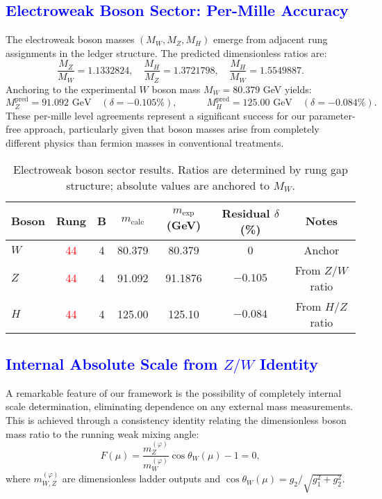 \documentclass[%
amsmath,amssymb,
aps,
prb,
floatfix, showkeys, 10pt,
]{revtex4-2}
\newcommand{\need}[1]{\textcolor{red}{#1}}
\newcommand{\modif}[1]{\textcolor{blue}{#1}}
\begin{document}
{\modif{ \subsection{Electroweak Boson Sector: Per-Mille Accuracy}
\label{subsec:boson_results}  }}
The electroweak boson masses $(M_W, M_Z, M_H)$ emerge from adjacent rung assignments in the ledger structure. The predicted dimensionless ratios are:
\begin{equation}
\frac{M_Z}{M_W} = 1.1332824, \quad
\frac{M_H}{M_Z} = 1.3721798, \quad
\frac{M_H}{M_W} = 1.5549887.
\end{equation}
Anchoring to the experimental $W$ boson mass $M_W = 80.379$ GeV yields:
\begin{equation}
M_Z^{\text{pred}} = 91.092 \text{ GeV} \quad (\delta = -0.105\%), \quad \quad \quad
M_H^{\text{pred}} = 125.00 \text{ GeV} \quad (\delta = -0.084\%).
\end{equation}
These per-mille level agreements represent a significant success for our parameter-free approach, particularly given that boson masses arise from completely different physics than fermion masses in conventional treatments.
\begin{table}[ht]
\centering
\caption{Electroweak boson sector results. Ratios are determined by rung gap structure; absolute values are anchored to $M_W$.}
\label{tab:bosons}
\begin{tabular}{lcccccc}
\hline\hline
Boson & Rung & B & $m_{\text{calc}}$ & $m_{\text{exp}}$ (GeV) & Residual $\delta$(\%) &  Notes \\
\hline
$W$ &  {\need{44}}    & 4 &  80.379 & 80.379     & 0        & Anchor           \\
$Z$ &  {\need{44}}    & 4 &  91.092 & 91.1876    & $-0.105$ & From $Z/W$ ratio \\
$H$ &  {\need{44}}    & 4 &  125.00 & 125.10     & $-0.084$ & From $H/Z$ ratio \\
\hline\hline
\end{tabular}
\end{table}









{\modif{  \subsection{Internal Absolute Scale from $Z/W$ Identity}
\label{subsec:internal_scale}  }}
A remarkable feature of our framework is the possibility of completely internal scale determination, eliminating dependence on any external mass measurements. This is achieved through a consistency identity relating the dimensionless boson mass ratio to the running weak mixing angle:
\begin{equation}
F(\mu) = \frac{m_Z^{(\varphi)}}{m_W^{(\varphi)}} \cos\theta_W(\mu) - 1 = 0,
\label{eq:consistency_identity}
\end{equation}
where $m_{W,Z}^{(\varphi)}$ are dimensionless ladder outputs and $\cos\theta_W(\mu) = g_2/\sqrt{g_1^2 + g_2^2}$.
\end{document}

